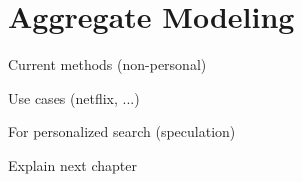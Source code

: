 \section{Aggregate Modeling}

Current methods (non-personal)

Use cases (netflix, ...)

For personalized search (speculation)

Explain next chapter



